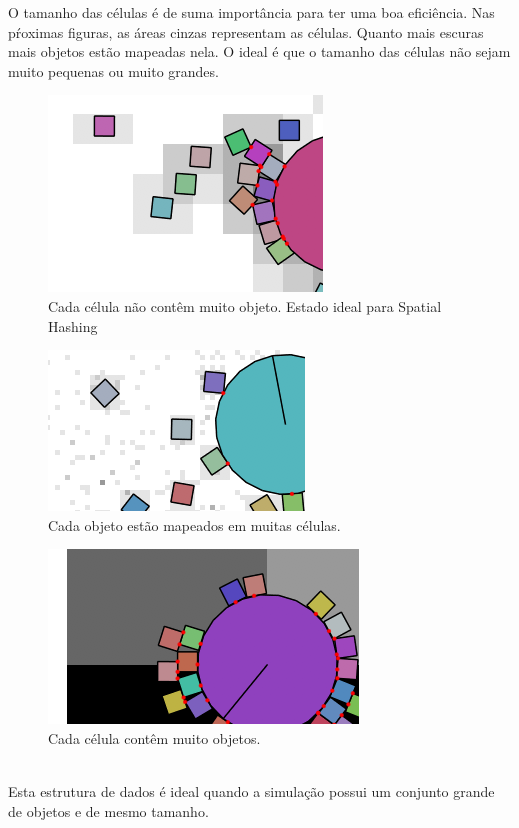 O tamanho das células é de suma importância para ter uma boa eficiência. Nas pŕoximas figuras, as áreas cinzas representam as células. Quanto mais escuras 
mais objetos estão mapeadas nela. O ideal é que o tamanho das células não sejam muito pequenas ou muito grandes.

\begin{figure}[!htbp]
  \includegraphics[scale=1]{hash_just_right.png}
  \caption{Cada célula não contêm muito objeto. Estado ideal para Spatial Hashing}
\end{figure}

\begin{figure}[!htbp]
  \includegraphics[scale=1]{hash_too_small.png}
  \caption{Cada objeto estão mapeados em muitas células.}
\end{figure}

\begin{figure}[!htbp]
  \includegraphics[scale=1]{hash_too_big.png}
  \caption{Cada célula contêm muito objetos.}
\end{figure}

\ \\
Esta estrutura de dados é ideal quando a simulação possui um conjunto grande de objetos e de mesmo tamanho.

